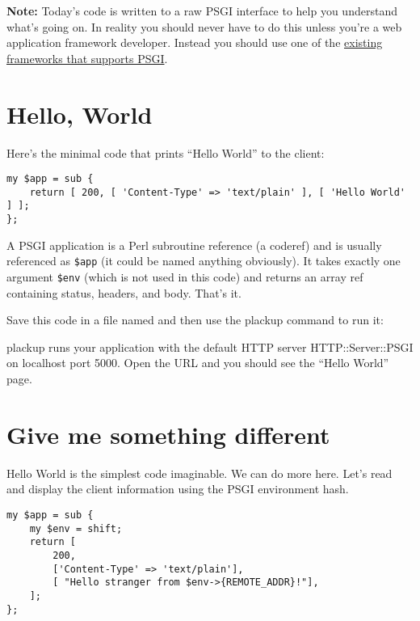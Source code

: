 \textbf{Note:} Today's code is written to a raw PSGI interface to help
you understand what's going on. In reality you should never have to do
this unless you're a web application framework developer. Instead you
should use one of the \href{http://plackperl.org/\#frameworks}{existing
frameworks that supports PSGI}.

\section{Hello, World}\label{hello-world}

Here's the minimal code that prints ``Hello World'' to the client:

\begin{lstlisting}
my $app = sub {
    return [ 200, [ 'Content-Type' => 'text/plain' ], [ 'Hello World' ] ];
};
\end{lstlisting}

A PSGI application is a Perl subroutine reference (a coderef) and is
usually referenced as \lstinline!$app! (it could be named anything
obviously). It takes exactly one argument \lstinline!$env! (which is not
used in this code) and returns an array ref containing status, headers,
and body. That's it.

Save this code in a file named  and then use the
plackup command to run it:


plackup runs your application with the default HTTP server
HTTP::Server::PSGI on localhost port 5000. Open the URL
 and you should see the ``Hello World'' page.

\section{Give me something
different}\label{give-me-something-different}

Hello World is the simplest code imaginable. We can do more here. Let's
read and display the client information using the PSGI environment hash.

\begin{lstlisting}
my $app = sub {
    my $env = shift;
    return [
        200,
        ['Content-Type' => 'text/plain'],
        [ "Hello stranger from $env->{REMOTE_ADDR}!"],
    ];
};
\end{lstlisting}

